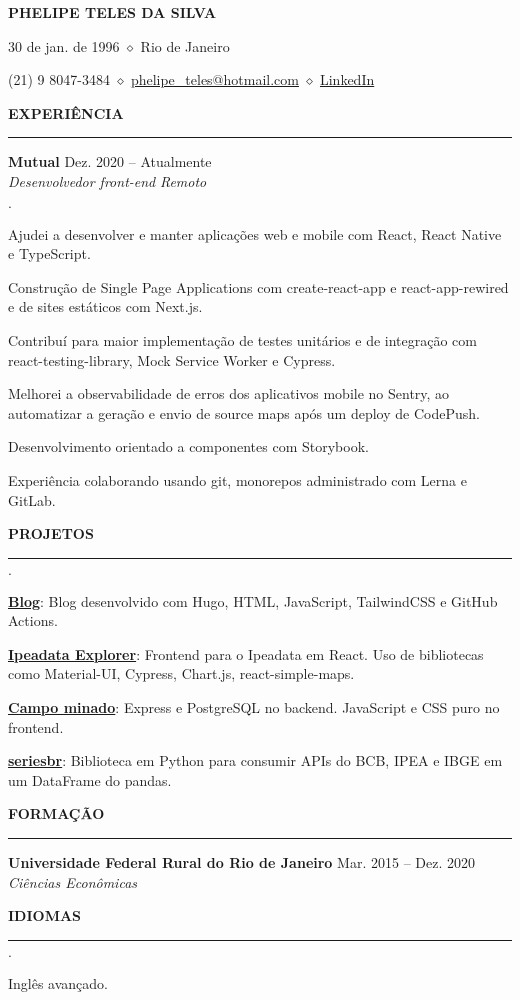 \documentclass[11pt,letterpaper]{article}
\newenvironment{tightlist}
  {\begin{list}
    {$\cdot$}
    {
      \setlength{\leftmargin}{0em}
      \setlength{\itemsep}{-0.5em}
    }
  }
{\end{list}}
\begin{document}
\pagestyle{empty}

\centerline{\huge\bf PHELIPE TELES DA SILVA}
\medskip

\centerline{30 de jan. de 1996 $\diamond$ Rio de Janeiro}
\smallskip

\centerline{
  (21) 9 8047-3484 $\diamond$
  \href{mailto:phelipe_teles@hotmail.com}{phelipe\_teles@hotmail.com} $\diamond$ \href{https://linkedin.com/in/phelipeteles}{LinkedIn}
}
\smallskip

\medskip \textbf{EXPERIÊNCIA} \medskip
\hrule

\textbf{Mutual} \hfill Dez. 2020 -- Atualmente \\
\emph{Desenvolvedor front-end} \hfill \emph{Remoto} {\parfillskip=0pt\par}

\begin{tightlist}
  \item Ajudei a desenvolver e manter aplicações web e mobile com React, React
    Native e TypeScript.
  \item Construção de Single Page Applications com create-react-app e
    react-app-rewired e de sites estáticos com Next.js.
  \item Contribuí para maior implementação de testes unitários e de integração
    com react-testing-library, Mock Service Worker e Cypress.
  \item Melhorei a observabilidade de erros dos aplicativos mobile no Sentry, ao
    automatizar a geração e envio de source maps após um deploy de CodePush.
  \item Desenvolvimento orientado a componentes com Storybook.
  \item Experiência colaborando usando git, monorepos administrado com Lerna e
    GitLab.
\end{tightlist}

\medskip \textbf{PROJETOS} \medskip
\hrule

\begin{tightlist}
 \item \href{https://phelipetls.github.io}{\textbf{Blog}}: Blog desenvolvido com
   Hugo, HTML, JavaScript, TailwindCSS e GitHub Actions.
 \item \href{http://ipeadata-explorer.surge.sh}{\textbf{Ipeadata Explorer}}:
   Frontend para o Ipeadata em React. Uso de bibliotecas como Material-UI,
   Cypress, Chart.js, react-simple-maps.
 \item \href{https://github.com/phelipetls/minesweeper.js}{\textbf{Campo minado}}:
   Express e PostgreSQL no backend. JavaScript e CSS puro no frontend.
 \item \href{https://github.com/phelipetls/seriesbr}{\textbf{seriesbr}}:
   Biblioteca em Python para consumir APIs do BCB, IPEA e IBGE em um DataFrame
   do pandas.
\end{tightlist}

\medskip \textbf{FORMAÇÃO} \medskip
\hrule

\textbf{Universidade Federal Rural do Rio de Janeiro} \hfill {Mar. 2015 -- Dez. 2020} \\
\emph{Ciências Econômicas}

\medskip \textbf{IDIOMAS} \medskip
\hrule

\begin{tightlist}
  \item Inglês avançado.
\end{tightlist}
\end{document}
